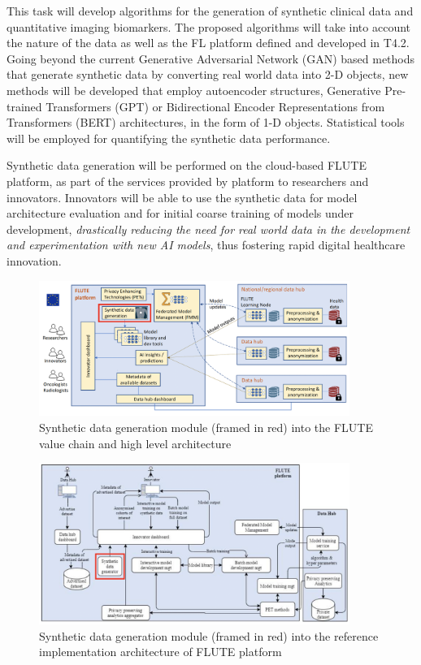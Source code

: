 \documentclass[a4paper,12pt]{article}
\begin{document}
This task will develop algorithms for the generation of synthetic clinical data and quantitative imaging biomarkers.
The proposed algorithms will take into account the nature of the data as well as the FL platform defined and
developed in T4.2. Going beyond the current Generative Adversarial Network (GAN) based methods that generate
synthetic data by converting real world data into 2-D objects, new methods will be developed that employ
autoencoder structures, Generative Pre-trained Transformers (GPT) or Bidirectional Encoder Representations from
Transformers (BERT) architectures, in the form of 1-D objects. Statistical tools will be employed for quantifying
the synthetic data performance. 

Synthetic data generation will be performed on the cloud-based FLUTE platform, as part of the services provided by platform to researchers and innovators. Innovators will be able to use the synthetic data for model architecture evaluation and for initial coarse training of models under development, \emph{drastically reducing the need for real world
data in the development and experimentation with new AI models}, thus fostering rapid digital healthcare innovation.

\begin{figure}[htb]
    \centering
    \includegraphics[width=0.9\textwidth]{pics/methodology1.png}
    \caption{Synthetic data generation module (framed in red) into the FLUTE value chain and high level architecture}
    \label{fig:methodology1}
\end{figure}


\begin{figure}[htb]
    \centering
    \includegraphics[width=0.9\textwidth]{pics/methodology2.png}
    \caption{Synthetic data generation module (framed in red) into the reference implementation architecture of FLUTE platform}
    \label{fig:methodology2}
\end{figure}
\end{document}
